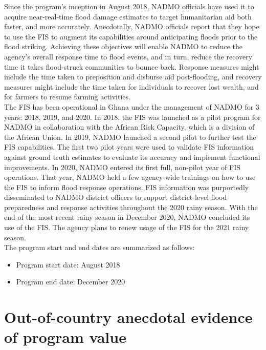 Since the program’s inception in August 2018, NADMO officials have used it to acquire near-real-time flood damage estimates to target humanitarian aid both faster, and more accurately. Anecdotally, NADMO officials report that they hope to use the FIS to augment its capabilities around anticipating floods prior to the flood striking. Achieving these objectives will enable NADMO to reduce the agency’s overall response time to flood events, and in turn, reduce the recovery time it takes flood-struck communities to bounce back. Response measures might include the time taken to preposition and disburse aid post-flooding, and recovery measures might include the time taken for individuals to recover lost wealth, and for farmers to resume farming activities.\\

The FIS has been operational in Ghana under the management of NADMO for 3 years: 2018, 2019, and 2020. In 2018, the FIS was launched as a pilot program for NADMO in collaboration with the African Risk Capacity, which is a division of the African Union. In 2019, NADMO launched a second pilot to further test the FIS capabilities. The first two pilot years were used to validate FIS information against ground truth estimates to evaluate its accuracy and implement functional improvements. In 2020, NADMO entered its first full, non-pilot year of FIS operations. That year, NADMO held a few agency-wide trainings on how to use the FIS to inform flood response operations. FIS information was purportedly disseminated to NADMO district officers to support district-level flood preparedness and response activities throughout the 2020 rainy season. With the end of the most recent rainy season in December 2020, NADMO concluded its use of the FIS. The agency plans to renew usage of the FIS for the 2021 rainy season.\\

The program start and end dates are summarized as follows:
\begin{itemize}
  \item Program start date: August 2018
  \item Program end date: December 2020
\end{itemize}

\section{Out-of-country anecdotal evidence of program value}

